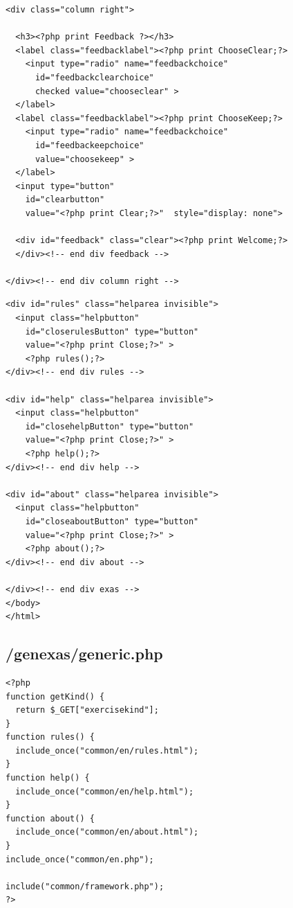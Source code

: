 \documentclass{article}
\begin{document}
\begin{verbatim}
<div class="column right">

  <h3><?php print Feedback ?></h3>
  <label class="feedbacklabel"><?php print ChooseClear;?>
    <input type="radio" name="feedbackchoice" 
      id="feedbackclearchoice" 
      checked value="chooseclear" >
  </label>
  <label class="feedbacklabel"><?php print ChooseKeep;?>
    <input type="radio" name="feedbackchoice"  
      id="feedbackeepchoice" 
      value="choosekeep" >
  </label>
  <input type="button" 
    id="clearbutton" 
    value="<?php print Clear;?>"  style="display: none">
		
  <div id="feedback" class="clear"><?php print Welcome;?>
  </div><!-- end div feedback -->

</div><!-- end div column right -->
\end{verbatim}
\begin{verbatim}
<div id="rules" class="helparea invisible">
  <input class="helpbutton" 
    id="closerulesButton" type="button" 
    value="<?php print Close;?>" >
    <?php rules();?>
</div><!-- end div rules -->

<div id="help" class="helparea invisible">
  <input class="helpbutton"  
    id="closehelpButton" type="button" 
    value="<?php print Close;?>" >
    <?php help();?>
</div><!-- end div help -->

<div id="about" class="helparea invisible">
  <input class="helpbutton"  
    id="closeaboutButton" type="button" 
    value="<?php print Close;?>" >
    <?php about();?>
</div><!-- end div about -->

</div><!-- end div exas -->
</body>
</html>
\end{verbatim}
\subsection{/genexas/generic.php}\label{appendix:generic}
\begin{verbatim}
<?php
function getKind() {
  return $_GET["exercisekind"];
}
function rules() {
  include_once("common/en/rules.html");
}
function help() {
  include_once("common/en/help.html");
}
function about() {
  include_once("common/en/about.html");
}
include_once("common/en.php");

include("common/framework.php");
?>
\end{verbatim}
\end{document}
